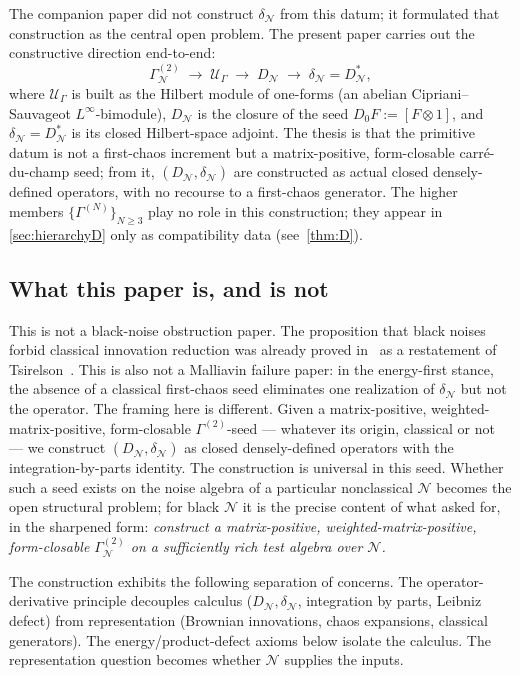 \documentclass[11pt,reqno]{amsart}
\theoremstyle{plain}
\theoremstyle{definition}
\theoremstyle{remark}
\newcommand{\cN}{\mathcal N}
\newcommand{\cU}{\mathcal U}
\newcommand{\dN}{D_{\cN}}
\newcommand{\divN}{\delta_{\cN}}
\begin{document}
The companion paper did not construct $\divN$ from this datum;
it formulated that construction as the central open problem.
The present paper carries out the constructive direction
end-to-end:
\begin{equation}\label{eq:constructive-arrow}
  \Gamma^{(2)}_{\cN}
  \;\longrightarrow\;
  \cU_{\Gamma}
  \;\longrightarrow\;
  \dN
  \;\longrightarrow\;
  \divN=\dN^{*},
\end{equation}
where $\cU_{\Gamma}$ is built as the
Hilbert module of one-forms (an abelian Cipriani--Sauvageot
$L^{\infty}$-bimodule), $\dN$ is the closure of the seed
$D_{0}F:=[F\otimes 1]$, and $\divN=\dN^{*}$ is its
closed Hilbert-space adjoint. The thesis is that the primitive
datum is not a first-chaos increment but a matrix-positive,
form-closable carr\'e-du-champ seed; from it, $(\dN,\divN)$ are
constructed as actual closed densely-defined operators, with no
recourse to a first-chaos generator. The higher members
$\{\Gamma^{(N)}\}_{N\ge 3}$ play no role in this construction;
they appear in \cref{sec:hierarchyD} only as compatibility data
(see~\cref{thm:D}).

\subsection{What this paper is, and is not}\label{sec:intro-claims}

This is not a black-noise obstruction paper. The proposition
that black noises forbid classical innovation reduction was
already proved in~\cite{PrimitiveDivergence} as a restatement
of Tsirelson~\cite{Tsirelson2004}. This is also not a Malliavin
failure paper: in the energy-first stance, the absence of a
classical first-chaos seed eliminates one realization of $\divN$
but not the operator. The framing here is different. Given a
matrix-positive, weighted-matrix-positive, form-closable $\Gamma^{(2)}$-seed --- whatever
its origin, classical or not --- we construct $(\dN,\divN)$ as
closed densely-defined operators with the integration-by-parts
identity. The construction is universal in this seed. Whether
such a seed exists on the noise algebra of a particular
nonclassical $\cN$ becomes the open structural problem; for
black $\cN$ it is the precise content of what
\cite[Prog.~7.1]{PrimitiveDivergence} asked for, in the
sharpened form: \emph{construct a matrix-positive, weighted-matrix-positive, form-closable
$\Gamma^{(2)}_{\cN}$ on a sufficiently rich test algebra over
$\cN$.}

The construction exhibits the following separation of concerns.
The operator-derivative principle decouples calculus
($\dN,\divN$, integration by parts, Leibniz defect) from
representation (Brownian innovations, chaos expansions, classical
generators). The energy/product-defect axioms below isolate the
calculus. The representation question becomes whether $\cN$
supplies the inputs.
\end{document}
